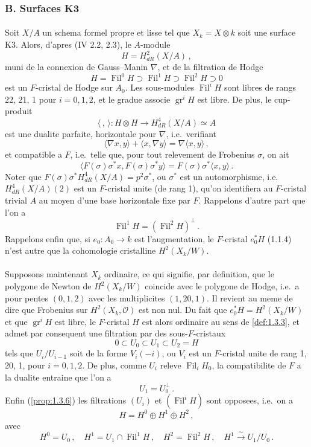 \documentclass[12pt,a4paper]{article}
\theoremstyle{plain}
\theoremstyle{definition}
\theoremstyle{remark}
\DeclareMathOperator{\gr}{gr}
\DeclareMathOperator{\Fil}{Fil}
\begin{document}
\subsubsection[B. Surfaces K3]{B. Surfaces K3}

\paragraph{}

Soit $X/A$ un schema formel propre et lisse tel que $X_k = X \otimes k$ soit une surface K3. Alors, d'apres (IV 2.2, 2.3), le $A$-module
\[
H = H_{dR}^2(X/A)\,,
\]
muni de la connexion de Gauss--Manin $\nabla$, et de la filtration de Hodge
\[
H = \Fil^0H \supset \Fil^1H \supset \Fil^2H \supset 0
\]
est un $F$-cristal de Hodge sur $A_0$. Les sous-modules $\Fil^iH$ sont libres de rangs 22, 21, 1 pour $i = 0, 1, 2$, et le gradue associe $\gr^iH$ est libre. De plus, le cup-produit
\[
\langle\,,\,\rangle : H \otimes H \longrightarrow H_{dR}^4(X/A) \simeq A
\]
est une dualite parfaite, horizontale pour $\nabla$, i.e.\ verifiant
\[
\langle\nabla x, y\rangle + \langle x, \nabla y\rangle = \nabla\langle x, y\rangle\,,
\]
et compatible a $F$, i.e.\ telle que, pour tout relevement de Frobenius $\sigma$, on ait
\[
\langle F(\sigma)\sigma^*x, F(\sigma)\sigma^*y\rangle = F(\sigma)\sigma^*\langle x, y\rangle\,.\]
Noter que $F(\sigma)\sigma^*H_{dR}^4(X/A) = p^2\sigma^*$, ou $\sigma^*$ est un automorphisme, i.e.\ $H_{dR}^4(X/A)(2)$ est un $F$-cristal unite (de rang 1), qu'on identifiera au $F$-cristal trivial $A$ au moyen d'une base horizontale fixe par $F$. Rappelons d'autre part que l'on a
\[
\Fil^1H = (\Fil^2H)^\perp\,.\]
Rappelons enfin que, si $e_0 : A_0 \to k$ est l'augmentation, le $F$-cristal $e_0^*H$ (1.1.4) n'est autre que la cohomologie cristalline $H^2(X_k/W)$.

\paragraph{}

Supposons maintenant $X_k$ ordinaire, ce qui signifie, par definition, que le polygone de Newton de $H^2(X_k/W)$ coincide avec le polygone de Hodge, i.e.\ a pour pentes $(0, 1, 2)$ avec les multiplicites $(1, 20, 1)$. Il revient au meme de dire que Frobenius sur $H^2(X_k, \mathcal{O})$ est non nul. Du fait que $e_0^*H = H^2(X_k/W)$ et que $\gr^iH$ est libre, le $F$-cristal $H$ est alors ordinaire au sens de \ref{def:1.3.3}, et admet par consequent une filtration par des sous-$F$-cristaux
\[
0 \subset U_0 \subset U_1 \subset U_2 = H
\]
tels que $U_i/U_{i-1}$ soit de la forme $V_i(-i)$, ou $V_i$ est un $F$-cristal unite de rang 1, 20, 1, pour $i = 0, 1, 2$. De plus, comme $U_i$ releve $\Fil_iH_0$, la compatibilite de $F$ a la dualite entraine que l'on a
\[
U_1 = U_0^\perp\,.\]
Enfin (\ref{prop:1.3.6}) les filtrations $(U_i)$ et $(\Fil^iH)$ sont opposees, i.e.\ on a
\[
H = H^0 \oplus H^1 \oplus H^2\,,
\]
avec
\[
H^0 = U_0\,, \quad H^1 = U_1 \cap \Fil^1H\,, \quad H^2 = \Fil^2H\,, \quad H^1 \xrightarrow{\sim} U_1/U_0\,.\]
\end{document}

